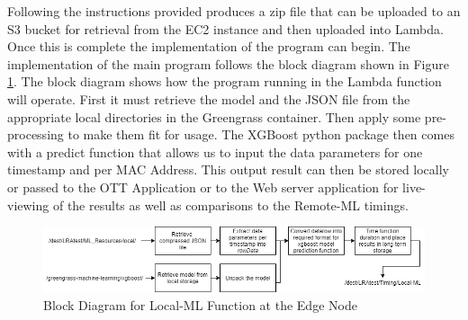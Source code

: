 Following the instructions provided produces a zip file that can be uploaded to an S3 bucket for retrieval from the EC2 instance and then uploaded into Lambda. Once this is complete the implementation of the program can begin. The implementation of the main program follows the block diagram shown in Figure \ref{fig:localml-function}. The block diagram shows how the program running in the Lambda function will operate. First it must retrieve the model and the JSON file from the appropriate local directories in the Greengrass container. Then apply some pre-processing to make them fit for usage. The XGBoost python package then comes with a predict function that allows us to input the data parameters for one timestamp and per MAC Address. This output result can then be stored locally or passed to the OTT Application or to the Web server application for live-viewing of the results as well as comparisons to the Remote-ML timings.

\begin{figure}[ht]
    \centering
    \includegraphics[width=1\linewidth]{pages/Chapter4/Chapter 4 Images/LambdaFns/localml-fn.png}
    \caption{Block Diagram for Local-ML Function at the Edge Node}
    \label{fig:localml-function}
\end{figure}

